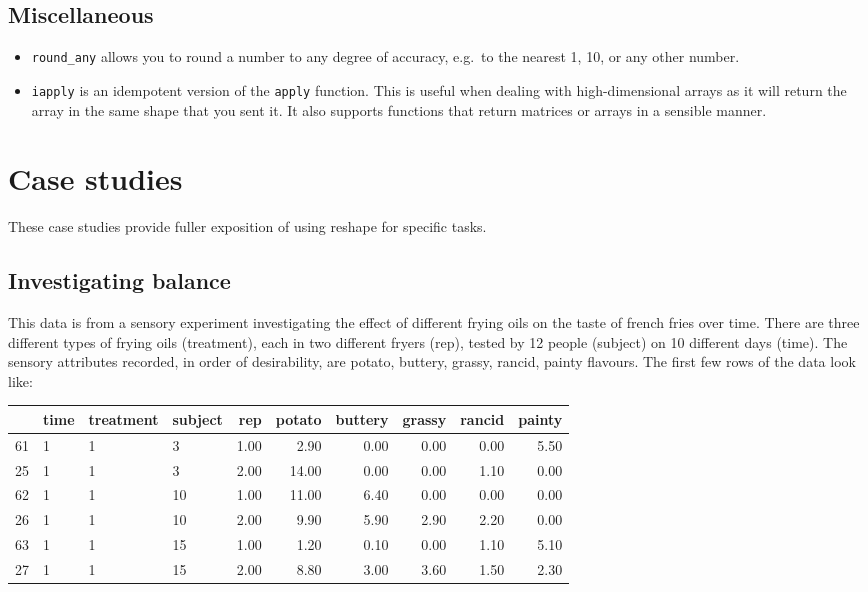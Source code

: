\documentclass[oneside,letterpaper]{scrartcl}
\begin{document}
\subsection{Miscellaneous}\label{sub:miscellaneous}

\begin{itemize}
	\item {\tt round\_any} allows you to round a number to any degree of accuracy, e.g.\ to the nearest 1, 10, or any other number.
	\item {\tt iapply} is an idempotent version of the {\tt apply} function.  This is useful when dealing with high-dimensional arrays as it will return the array in the same shape that you sent it.  It also supports functions that return matrices or arrays in a sensible manner.
\end{itemize}

\newpage
\section{Case studies}\label{sec:case_studies}

These case studies provide fuller exposition of using reshape for specific tasks.

\subsection{Investigating balance}\label{sub:investigating_balance}

This data is from a sensory experiment investigating the effect of different frying oils on the taste of french fries over time.  There are three different types of frying oils (treatment), each in two different fryers (rep), tested by 12 people (subject) on 10 different days (time).  The sensory attributes recorded, in order of desirability, are potato, buttery, grassy, rancid, painty flavours.  The first few rows of the data look like:

\begin{table}[ht]
\begin{center}
\begin{tabular}{rlllrrrrrr}
\hline
 & time & treatment & subject & rep & potato & buttery & grassy & rancid & painty \\
\hline
61 & 1 & 1 & 3 & 1.00 & 2.90 & 0.00 & 0.00 & 0.00 & 5.50 \\
25 & 1 & 1 & 3 & 2.00 & 14.00 & 0.00 & 0.00 & 1.10 & 0.00 \\
62 & 1 & 1 & 10 & 1.00 & 11.00 & 6.40 & 0.00 & 0.00 & 0.00 \\
26 & 1 & 1 & 10 & 2.00 & 9.90 & 5.90 & 2.90 & 2.20 & 0.00 \\
63 & 1 & 1 & 15 & 1.00 & 1.20 & 0.10 & 0.00 & 1.10 & 5.10 \\
27 & 1 & 1 & 15 & 2.00 & 8.80 & 3.00 & 3.60 & 1.50 & 2.30 \\
\hline
\end{tabular}
\end{center}
\end{table}
\end{document}
